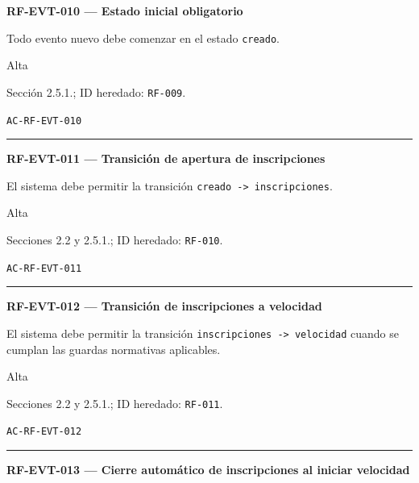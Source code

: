 \documentclass[10pt,letterpaper]{article}
\begin{document}
\noindent\textbf{RF-EVT-010 --- Estado inicial obligatorio}\par
\begin{description}[style=nextline,leftmargin=3.15cm,labelwidth=2.8cm,font=\normalfont\bfseries]
\item[Obligación] Todo evento nuevo debe comenzar en el estado \texttt{creado}.
\item[Prioridad] Alta
\item[Procedencia] Sección 2.5.1.; ID heredado: \texttt{RF-009}.
\item[Verificación] \texttt{AC-RF-EVT-010}
\end{description}
\vspace{0.25em}\hrule\vspace{0.65em}
\noindent\textbf{RF-EVT-011 --- Transición de apertura de inscripciones}\par
\begin{description}[style=nextline,leftmargin=3.15cm,labelwidth=2.8cm,font=\normalfont\bfseries]
\item[Obligación] El sistema debe permitir la transición \texttt{creado -> inscripciones}.
\item[Prioridad] Alta
\item[Procedencia] Secciones 2.2 y 2.5.1.; ID heredado: \texttt{RF-010}.
\item[Verificación] \texttt{AC-RF-EVT-011}
\end{description}
\vspace{0.25em}\hrule\vspace{0.65em}
\noindent\textbf{RF-EVT-012 --- Transición de inscripciones a velocidad}\par
\begin{description}[style=nextline,leftmargin=3.15cm,labelwidth=2.8cm,font=\normalfont\bfseries]
\item[Obligación] El sistema debe permitir la transición \texttt{inscripciones -> velocidad} cuando se cumplan las guardas normativas aplicables.
\item[Prioridad] Alta
\item[Procedencia] Secciones 2.2 y 2.5.1.; ID heredado: \texttt{RF-011}.
\item[Verificación] \texttt{AC-RF-EVT-012}
\end{description}
\vspace{0.25em}\hrule\vspace{0.65em}
\noindent\textbf{RF-EVT-013 --- Cierre automático de inscripciones al iniciar velocidad}\par
\end{document}

